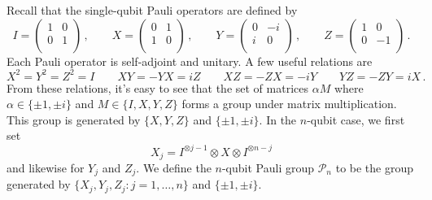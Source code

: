 \documentclass[11pt]{article}
\numberwithin{equation}{section}
\begin{document}
Recall that the single-qubit Pauli operators are defined by
$$
I =
\begin{pmatrix} 
1 & 0 \\
0 & 1 \\
\end{pmatrix}\,,
\qquad
X =
\begin{pmatrix} 
0 & 1 \\
1 & 0 \\
\end{pmatrix}\,,
\qquad
Y =
\begin{pmatrix} 
0 & -i \\
i & 0 \\
\end{pmatrix}\,,
\qquad
Z = 
\begin{pmatrix} 
1 & 0 \\
0 & -1 \\
\end{pmatrix}\,.
$$
Each Pauli operator is self-adjoint and unitary. A few useful relations are
$$
X^2 = Y^2 = Z^2 = I
\qquad
XY = -YX = iZ
\qquad
XZ = -ZX = -iY
\qquad 
YZ = -ZY = iX\,.
$$
From these relations, it's easy to see that the set of matrices $\alpha M$ where $\alpha \in \{\pm 1, \pm i\}$ and $M \in \{I, X, Y, Z\}$ forms a group under matrix multiplication. This group is generated by $\{X, Y, Z\}$ and $\{\pm 1, \pm  i\}$. In the $n$-qubit case, we first set
$$
X_j = I^{\otimes j-1} \otimes X \otimes I^{\otimes n-j}
$$
and likewise for $Y_j$ and $Z_j$. We define the $n$-qubit Pauli group $\mathcal P_n$ to be the group generated by $\{X_j, Y_j, Z_j : j = 1, \dots, n \}$  and $\{\pm 1, \pm i\}$.
\end{document}
